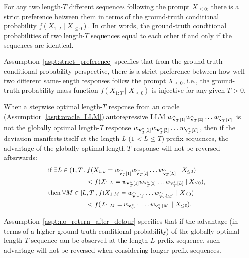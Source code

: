 \begin{assumption}\label{aspt:strict_preference}
    For any two length-$T$ different sequences following the prompt $X_{\leq 0}$, there is a strict preference between them in terms of the ground-truth conditional probability $f(X_{1:T} \mid X_{\leq 0})$.
    In other words, the ground-truth conditional probabilities of two length-$T$ sequences equal to each other if and only if the sequences are identical.
\end{assumption}
Assumption~\ref{aspt:strict_preference} specifies that from the ground-truth conditional probability perspective, there is a strict preference between how well two different same-length responses follow the prompt $X_{\leq 0}$, i.e., the ground-truth probability mass function $f(X_{1:T} \mid X_{\leq 0})$ is injective for any given $T > 0$.

\begin{assumption}\label{aspt:no_return_after_detour}
    When a stepwise optimal length-$T$ response from an oracle (Assumption~\ref{aspt:oracle_LLM}) autoregressive LLM $w_{\widehat{\mathbf{v}}_T[1]} w_{\widehat{\mathbf{v}}_T[2]} \ldots w_{\widehat{\mathbf{v}}_T[T]}$ is not the globally optimal length-$T$ response $w_{\mathbf{v}_T^*[1]} w_{\mathbf{v}_T^*[2]} \ldots w_{\mathbf{v}_T^*[T]}$, then if the deviation manifests itself at the length-$L$ ($1 < L \leq T$) prefix-sequences, the advantage of the globally optimal length-$T$ response will not be reversed afterwards:
    \begin{equation*}
        \small
        \begin{split}
             & \text{if }\exists L \in (1, T], f(X_{1:L} = w_{\widehat{\mathbf{v}}_T[1]} w_{\widehat{\mathbf{v}}_T[2]} \ldots w_{\widehat{\mathbf{v}}_T[L]} \mid X_{\leq 0})                                                  \\
             & \quad\quad\quad\quad\quad\quad < f(X_{1:L} = w_{\mathbf{v}_T^*[1]} w_{\mathbf{v}_T^*[2]} \ldots w_{\mathbf{v}_T^*[L]} \mid X_{\leq 0}),                                                                        \\
             & \text{then }\forall M \in [L, T], f(X_{1:M} = w_{\widehat{\mathbf{v}}_T[1]} \ldots w_{\widehat{\mathbf{v}}_T[M]} \mid X_{\leq 0}) \\
             & \quad\quad\quad\quad\quad\quad < f(X_{1:M} = w_{\mathbf{v}_T^*[1]} \ldots w_{\mathbf{v}_T^*[M]} \mid X_{\leq 0}).
        \end{split}
    \end{equation*}
\end{assumption}
Assumption~\ref{aspt:no_return_after_detour} specifies that if the advantage (in terms of a higher ground-truth conditional probability) of the globally optimal length-$T$ sequence can be observed at the length-$L$ prefix-sequence, such advantage will not be reversed when considering longer prefix-sequences.

